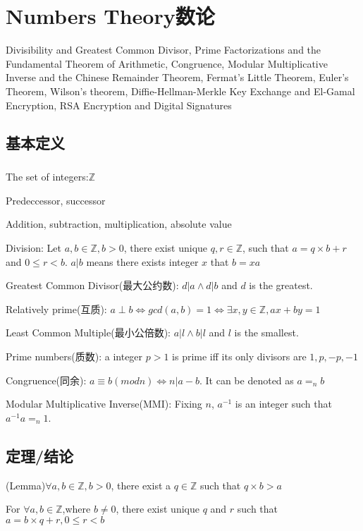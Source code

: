 \documentclass[12pt,a4paper]{ctexrep}
\begin{document}
\fi

\chapter{Numbers Theory数论}
Divisibility and Greatest Common Divisor, Prime Factorizations and the Fundamental Theorem of Arithmetic, Congruence, Modular Multiplicative Inverse and the Chinese Remainder Theorem, Fermat's Little Theorem, Euler's Theorem, Wilson's theorem, Diffie-Hellman-Merkle Key Exchange and El-Gamal Encryption, RSA Encryption and Digital Signatures
\section{基本定义}
\paragraph{}
The set of integers:$\mathbb{Z}$ 

Predeccessor, successor

Addition, subtraction, multiplication, absolute value

Division: Let $a,b \in \mathbb{Z}, b>0$, there exist unique $q,r \in \mathbb{Z}$, such that $a=q\times b+r$ and $0\leq r < b$. $a|b$ means there exists integer $x$ that $b = xa$

Greatest Common Divisor(最大公约数): $d|a \wedge d|b$ and $d$ is the greatest.

Relatively prime(互质): $a\perp b \Leftrightarrow gcd(a,b) = 1 \Leftrightarrow \exists x,y \in \mathbb{Z}, ax+by=1$

Least Common Multiple(最小公倍数): $a|l \wedge b|l$ and $l$ is the smallest.

Prime numbers(质数): a integer $p>1$ is prime iff its only divisors are $1,p,-p,-1$

Congruence(同余): $a\equiv b(mod n) \Leftrightarrow n|a-b$. It can be denoted as $a=_n b$

Modular Multiplicative Inverse(MMI): Fixing $n$, $a^{-1}$ is an integer such that $a^{-1}a =_n 1$.

\section{定理/结论}
(Lemma)$\forall a,b \in \mathbb{Z}, b>0$, there exist a $q \in \mathbb{Z}$ such that $q \times b >a$

For $\forall a,b \in \mathbb{Z}$,where $b \neq 0$, there exist unique $q$ and $r$ such that $a = b\times q+r, 0\leq r<b$
\end{document}
